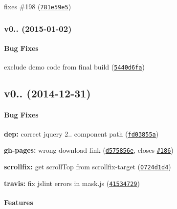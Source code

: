 fixes \#198 (\href{http://github.com/angular-ui/ui-utils/commit/781e59e5a1fa72db91eca6a257408ffe72da0c57}{\tt 781e59e5})

\label{_v0.2.1}%
 \subsubsection*{v0.. (2015-\/01-\/02)}

\paragraph*{Bug Fixes}


\begin{DoxyItemize}
\item exclude demo code from final build (\href{http://github.com/angular-ui/ui-utils/commit/8c91c5e1f4e43baf9bb910e39640586497ac06d0}{\tt 5440d6fa})
\end{DoxyItemize}

\label{_v0.2.0}%
 \subsection*{v0.. (2014-\/12-\/31)}

\paragraph*{Bug Fixes}


\begin{DoxyItemize}
\item {\bfseries dep\+:} correct jquery 2.. component path (\href{http://github.com/angular-ui/ui-utils/commit/fd03855ac336d00ce19685f4df90b862e2f5c9b4}{\tt fd03855a})
\item {\bfseries gh-\/pages\+:} wrong download link (\href{http://github.com/angular-ui/ui-utils/commit/d575856e9ce575d40015d532d8a3684521f5d26d}{\tt d575856e}, closes \href{http://github.com/angular-ui/ui-utils/issues/186}{\tt \#186})
\item {\bfseries scrollfix\+:} get scroll\+Top from scrollfix-\/target (\href{http://github.com/angular-ui/ui-utils/commit/0724d1d41593d3d89ecd015026576570360f2f20}{\tt 0724d1d4})
\item {\bfseries travis\+:} fix jslint errors in mask.\+js (\href{http://github.com/angular-ui/ui-utils/commit/415347293d7200d8fc4a14b99e9744249e6c80da}{\tt 41534729})
\end{DoxyItemize}

\paragraph*{Features}


